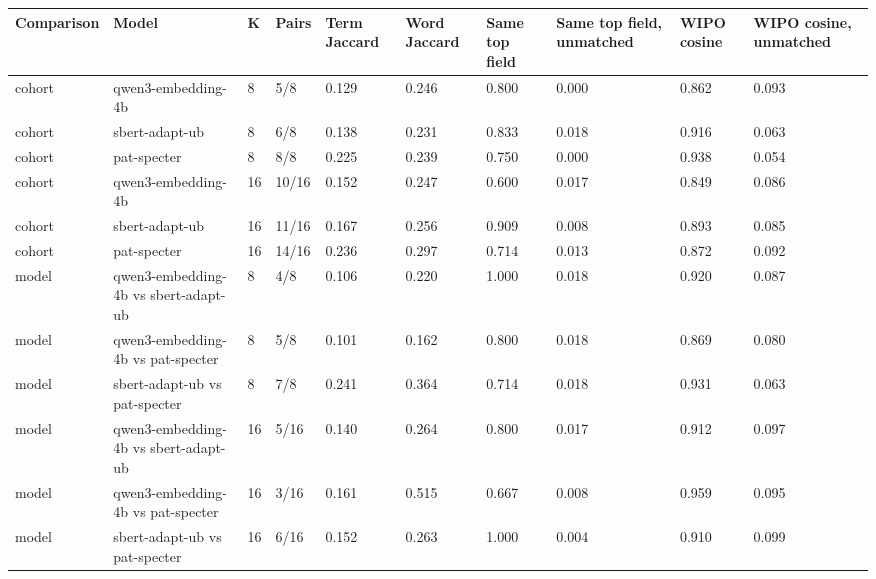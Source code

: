 \begin{tabular}{llllllllll}
\toprule
Comparison & Model & K & Pairs & Term Jaccard & Word Jaccard & Same top field & Same top field, unmatched & WIPO cosine & WIPO cosine, unmatched \\
\midrule
cohort & qwen3-embedding-4b & 8 & 5/8 & 0.129 & 0.246 & 0.800 & 0.000 & 0.862 & 0.093 \\
cohort & sbert-adapt-ub & 8 & 6/8 & 0.138 & 0.231 & 0.833 & 0.018 & 0.916 & 0.063 \\
cohort & pat-specter & 8 & 8/8 & 0.225 & 0.239 & 0.750 & 0.000 & 0.938 & 0.054 \\
cohort & qwen3-embedding-4b & 16 & 10/16 & 0.152 & 0.247 & 0.600 & 0.017 & 0.849 & 0.086 \\
cohort & sbert-adapt-ub & 16 & 11/16 & 0.167 & 0.256 & 0.909 & 0.008 & 0.893 & 0.085 \\
cohort & pat-specter & 16 & 14/16 & 0.236 & 0.297 & 0.714 & 0.013 & 0.872 & 0.092 \\
model & qwen3-embedding-4b vs sbert-adapt-ub & 8 & 4/8 & 0.106 & 0.220 & 1.000 & 0.018 & 0.920 & 0.087 \\
model & qwen3-embedding-4b vs pat-specter & 8 & 5/8 & 0.101 & 0.162 & 0.800 & 0.018 & 0.869 & 0.080 \\
model & sbert-adapt-ub vs pat-specter & 8 & 7/8 & 0.241 & 0.364 & 0.714 & 0.018 & 0.931 & 0.063 \\
model & qwen3-embedding-4b vs sbert-adapt-ub & 16 & 5/16 & 0.140 & 0.264 & 0.800 & 0.017 & 0.912 & 0.097 \\
model & qwen3-embedding-4b vs pat-specter & 16 & 3/16 & 0.161 & 0.515 & 0.667 & 0.008 & 0.959 & 0.095 \\
model & sbert-adapt-ub vs pat-specter & 16 & 6/16 & 0.152 & 0.263 & 1.000 & 0.004 & 0.910 & 0.099 \\
\bottomrule
\end{tabular}
